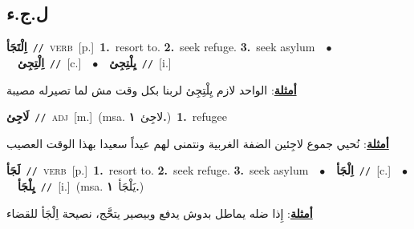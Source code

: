 \documentclass[10pt,a4paper,twoside]{article} %
\begin{document}
\begin{multicols}{2}
\vspace{-3mm}
\subsection*{\color{blue}\foreignlanguage{arabic}{ل.ج.ء}\color{blue}{}} 

{\setlength\topsep{0pt}\textbf{\foreignlanguage{arabic}{اِلْتَجَأ}}\ {\color{gray}\texttt{//}\color{black}}\ \textsc{verb}\ [p.]\ \textbf{1.}~resort to.  \textbf{2.}~seek refuge.  \textbf{3.}~seek asylum\ \ $\bullet$\ \ \setlength\topsep{0pt}\textbf{\foreignlanguage{arabic}{اِلْتِجِئ}}\ {\color{gray}\texttt{//}\color{black}}\ [c.]\ \ $\bullet$\ \ \setlength\topsep{0pt}\textbf{\foreignlanguage{arabic}{يِلْتِجِئ}}\ {\color{gray}\texttt{//}\color{black}}\ [i.]\  \begin{flushright}\color{gray}\foreignlanguage{arabic}{\textbf{\underline{\foreignlanguage{arabic}{أمثلة}}}: الواحد لازم يِلْتِجِئ لربنا بكل وقت مش لما تصيرله مصيبة}\end{flushright}\color{black}} \vspace{2mm}

{\setlength\topsep{0pt}\textbf{\foreignlanguage{arabic}{لَاجِئ}}\ {\color{gray}\texttt{//}\color{black}}\ \textsc{adj}\ [m.]\ \color{gray}(msa. \foreignlanguage{arabic}{لاجِئ}~\foreignlanguage{arabic}{\textbf{١.}})\color{black}\ \textbf{1.}~refugee\  \begin{flushright}\color{gray}\foreignlanguage{arabic}{\textbf{\underline{\foreignlanguage{arabic}{أمثلة}}}: نُحيي جموع لاجِئين الضفة الغربية ونتمنى لهم عيداً سعيدا بهذا الوقت العصيب}\end{flushright}\color{black}} \vspace{2mm}

{\setlength\topsep{0pt}\textbf{\foreignlanguage{arabic}{لَجَأ}}\ {\color{gray}\texttt{//}\color{black}}\ \textsc{verb}\ [p.]\ \textbf{1.}~resort to.  \textbf{2.}~seek refuge.  \textbf{3.}~seek asylum\ \ $\bullet$\ \ \setlength\topsep{0pt}\textbf{\foreignlanguage{arabic}{اِلْجَأ}}\ {\color{gray}\texttt{//}\color{black}}\ [c.]\ \ $\bullet$\ \ \setlength\topsep{0pt}\textbf{\foreignlanguage{arabic}{يِلْجَأ}}\ {\color{gray}\texttt{//}\color{black}}\ [i.]\ \color{gray}(msa. \foreignlanguage{arabic}{يَلْجَأ}~\foreignlanguage{arabic}{\textbf{١.}})\color{black}\  \begin{flushright}\color{gray}\foreignlanguage{arabic}{\textbf{\underline{\foreignlanguage{arabic}{أمثلة}}}: إِذا ضله يماطل بدوش يدفع وبيصير يتحَّج، نصيحة اِلْجَأ للقضاء}\end{flushright}\color{black}} \vspace{2mm}


\end{multicols}
\end{document}
